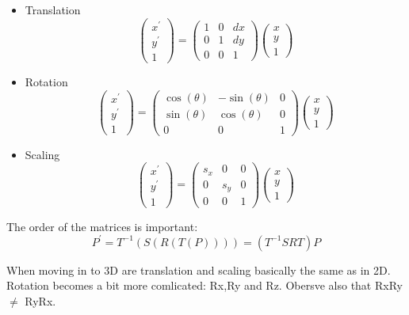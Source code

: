 	\begin{itemize}
		\item Translation 
			\begin{equation}
				\begin{pmatrix} x^{\prime} \\ y^{\prime} \\ 1 \end{pmatrix} =
				\begin{pmatrix} 1& 0& dx \\ 0& 1& dy \\ 0& 0& 1 \end{pmatrix} 
				\begin{pmatrix} x \\ y \\ 1 \end{pmatrix}
			\end{equation}
		\item Rotation
			\begin{equation}
				\begin{pmatrix} x^{\prime} \\ y^{\prime} \\ 1 \end{pmatrix} =
				\begin{pmatrix} \cos(\theta)& -\sin(\theta)& 0 \\ \sin(\theta)& \cos(\theta)& 0 \\ 0& 0& 1 \end{pmatrix} 
				\begin{pmatrix} x \\ y \\ 1 \end{pmatrix}
			\end{equation}
		\item Scaling
			\begin{equation}
				\begin{pmatrix} x^{\prime} \\ y^{\prime} \\ 1 \end{pmatrix} =
				\begin{pmatrix} s_x& 0& 0 \\ 0& s_y& 0 \\ 0& 0& 1 \end{pmatrix} 
				\begin{pmatrix} x \\ y \\ 1 \end{pmatrix}
			\end{equation}
	\end{itemize}

	\noindent The order of the matrices is important:
		\begin{equation}
			P^{\prime} = T^{-1} (S(R(T(P)))) = (T^{-1}SRT)P
		\end{equation}

	\noindent When moving in to 3D are translation and scaling basically the same as in 2D. Rotation becomes a bit more comlicated: Rx,Ry and Rz. Obersve also that RxRy $\neq$ RyRx.

	
		  









